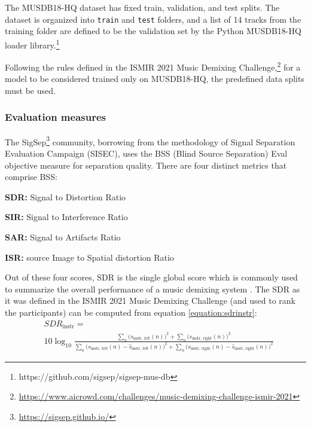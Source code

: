 \documentclass[report.tex]{subfiles}
\begin{document}
The MUSDB18-HQ dataset has fixed train, validation, and test splits. The dataset is organized into \Verb#train# and \Verb#test# folders, and a list of 14 tracks from the training folder are defined to be the validation set by the Python MUSDB18-HQ loader library.\footnote{https://github.com/sigsep/sigsep-mus-db}

Following the rules defined in the ISMIR 2021 Music Demixing Challenge,\footnote{\url{https://www.aicrowd.com/challenges/music-demixing-challenge-ismir-2021}} for a model to be considered trained only on MUSDB18-HQ, the predefined data splits must be used.

\subsubsection{Evaluation measures}
\label{sec:evalbss}

The SigSep\footnote{\url{https://sigsep.github.io/}} community, borrowing from the methodology of Signal Separation Evaluation Campaign (SISEC), uses the BSS (Blind Source Separation) Eval \parencite{bss, bss2} objective measure for separation quality. There are four distinct metrics that comprise BSS:

\begin{tight_itemize}
\item
	\textbf{SDR:} Signal to Distortion Ratio
\item
	\textbf{SIR:} Signal to Interference Ratio
\item
	\textbf{SAR:} Signal to Artifacts Ratio
\item
	\textbf{ISR:} source Image to Spatial distortion Ratio
\end{tight_itemize}

Out of these four scores, SDR is the single global score which is commonly used to summarize the overall performance of a music demixing system \parencite{sdruseful}. The SDR as it was defined in the ISMIR 2021 Music Demixing Challenge (and used to rank the participants) can be computed from equation \eqref{equation:sdrinstr}:
\begin{align}
	\nonumber & \mathit{SDR}_{\text{instr}} = \\
	&10 \log_{10}\frac{\sum_{n}\big(s_{\text{instr, left}}(n)\big)^{2} + \sum_{n}\big(s_{\text{instr, right}}(n)\big)^{2}}{\sum_{n}\big(s_{\text{instr, left}}(n) - \hat{s}_{\text{instr, left}}(n)\big)^{2} + \sum_{n}\big(s_{\text{instr, right}}(n) - \hat{s}_{\text{instr, right}}(n)\big)^{2}} \tag{22}\label{equation:sdrinstr}
\end{align}
\end{document}
